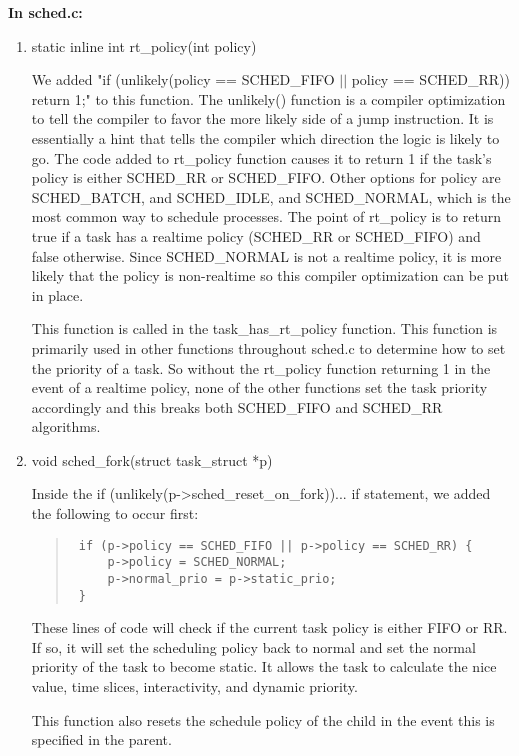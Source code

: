 \documentclass[letterpaper,10pt,titlepage]{article}
\begin{document}
{\bfseries In sched.c:}
\begin{enumerate}
    \item static inline int rt\_policy(int policy)

        We added "if (unlikely(policy == SCHED\_FIFO $||$ policy == SCHED\_RR)) return 1;" to this function. The unlikely() function is a compiler optimization to tell the compiler to favor the more likely side of a jump instruction. It is essentially a hint that tells the compiler which direction the logic is likely to go. The code added to rt\_policy function causes it to return 1 if the task's policy is either SCHED\_RR or SCHED\_FIFO. Other options for policy are SCHED\_BATCH, and SCHED\_IDLE, and SCHED\_NORMAL, which is the most common way to schedule processes. The point of rt\_policy is to return true if a task has a realtime policy (SCHED\_RR or SCHED\_FIFO) and false otherwise. Since SCHED\_NORMAL is not a realtime policy, it is more likely that the policy is non-realtime so this compiler optimization can be put in place. 
        
        This function is called in the task\_has\_rt\_policy function. This function is primarily used in other functions throughout sched.c to determine how to set the priority of a task. So without the rt\_policy function returning 1 in the event of a realtime policy, none of the other functions set the task priority accordingly and this breaks both SCHED\_FIFO and SCHED\_RR algorithms.

\newpage
\item void sched\_fork(struct task\_struct *p)

Inside the if (unlikely(p->sched\_reset\_on\_fork)){...} if statement, we added the following to occur first:
\begin{quotation}
\begin{verbatim}
 if (p->policy == SCHED_FIFO || p->policy == SCHED_RR) {
     p->policy = SCHED_NORMAL;
     p->normal_prio = p->static_prio;
 }
\end{verbatim}
\end{quotation}
These lines of code will check if the current task policy is either FIFO or RR. If so, it will set the scheduling policy back to normal and set the normal priority of the task to become static. It allows the task to calculate the nice value, time slices, interactivity, and dynamic priority.

This function also resets the schedule policy of the child in the event this is specified in the parent.



\end{enumerate}
\end{document}
